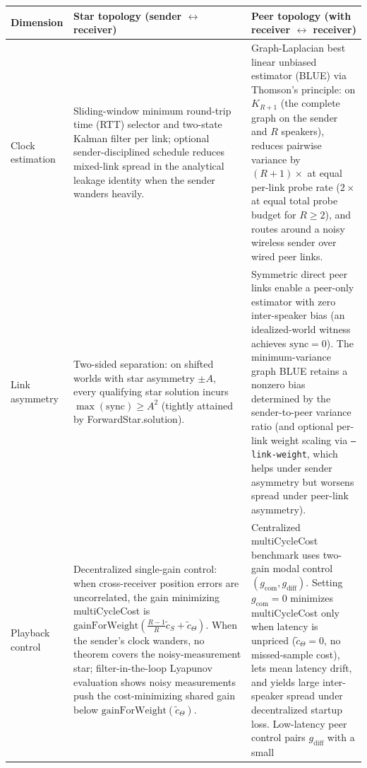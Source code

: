 \documentclass[11pt,a4paper]{article}
\DeclareRobustCommand{\lean}[1]{{\ttfamily\def\_{\textunderscore\allowbreak}#1}}
\theoremstyle{definition}
\begin{document}
\begin{table}[htb]
\centering
\small
\begin{tabular}{@{}l >{\raggedright\arraybackslash}p{5.8cm} >{\raggedright\arraybackslash}p{6.2cm}@{}}
\toprule
Dimension & Star topology (sender $\leftrightarrow$ receiver) & Peer topology (with receiver $\leftrightarrow$ receiver) \\
\midrule
Clock estimation &
  Sliding-window minimum round-trip time (RTT) selector and two-state Kalman
  filter per link; optional sender-disciplined schedule reduces mixed-link
  spread in the analytical leakage identity when the sender wanders heavily. &
  Graph-Laplacian best linear unbiased estimator (BLUE) via Thomson's principle:
  on $K_{R+1}$ (the complete graph on the sender and $R$ speakers), reduces
  pairwise variance by $(R{+}1)\times$ at equal per-link probe rate ($2\times$
  at equal total probe budget for $R \ge 2$), and routes around a noisy wireless
  sender over wired peer links. \\
\addlinespace[4pt]
Link asymmetry &
  Two-sided separation: on shifted worlds with star asymmetry $\pm A$, every
  qualifying star solution incurs $\max(\mathrm{sync}) \ge A^2$ (tightly
  attained by \lean{ForwardStar.solution}). &
  Symmetric direct peer links enable a peer-only estimator with zero
  inter-speaker bias (an idealized-world witness achieves $\mathrm{sync} = 0$).
  The minimum-variance graph BLUE retains a nonzero bias determined by the
  sender-to-peer variance ratio (and optional per-link weight scaling via
  \texttt{--link-weight}, which helps under sender asymmetry but worsens spread
  under peer-link asymmetry). \\
\addlinespace[4pt]
Playback control &
  Decentralized single-gain control: when cross-receiver position errors are
  uncorrelated, the gain minimizing \lean{multiCycleCost} is
  $\mathrm{gainForWeight}(\frac{R-1}{R}\tilde c_S + \tilde c_\Theta)$. When the
  sender's clock wanders, no theorem covers the noisy-measurement star;
  filter-in-the-loop Lyapunov evaluation shows noisy measurements push the
  cost-minimizing shared gain below $\mathrm{gainForWeight}(\tilde c_\Theta)$. &
  Centralized \lean{multiCycleCost} benchmark uses two-gain modal control
  $(g_{\mathrm{com}}, g_{\mathrm{diff}})$. Setting $g_{\mathrm{com}} = 0$
  minimizes \lean{multiCycleCost} only when latency is unpriced
  ($\tilde c_\Theta = 0$, no missed-sample cost), lets mean latency drift, and
  yields large inter-speaker spread under decentralized startup loss.
  Low-latency peer control pairs $g_{\mathrm{diff}}$ with a small

\end{tabular}
\end{table}
\end{document}

